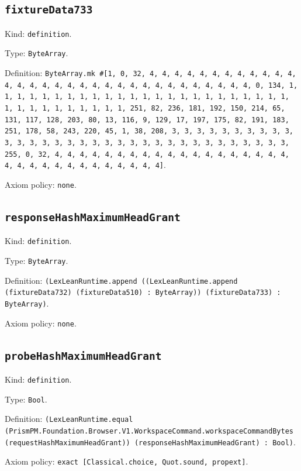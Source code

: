 \documentclass[11pt]{article}
\begin{document}
\subsection*{\texttt{fixtureData733}}
\noindent Kind: \texttt{definition}.\par
\noindent Type: \texttt{ByteArray}.\par
\noindent Definition: \texttt{ByteArray.mk \#[1, 0, 32, 4, 4, 4, 4, 4, 4, 4, 4, 4, 4, 4, 4, 4, 4, 4, 4, 4, 4, 4, 4, 4, 4, 4, 4, 4, 4, 4, 4, 4, 4, 4, 4, 0, 134, 1, 1, 1, 1, 1, 1, 1, 1, 1, 1, 1, 1, 1, 1, 1, 1, 1, 1, 1, 1, 1, 1, 1, 1, 1, 1, 1, 1, 1, 1, 1, 1, 1, 1, 251, 82, 236, 181, 192, 150, 214, 65, 131, 117, 128, 203, 80, 13, 116, 9, 129, 17, 197, 175, 82, 191, 183, 251, 178, 58, 243, 220, 45, 1, 38, 208, 3, 3, 3, 3, 3, 3, 3, 3, 3, 3, 3, 3, 3, 3, 3, 3, 3, 3, 3, 3, 3, 3, 3, 3, 3, 3, 3, 3, 3, 3, 3, 3, 3, 255, 0, 32, 4, 4, 4, 4, 4, 4, 4, 4, 4, 4, 4, 4, 4, 4, 4, 4, 4, 4, 4, 4, 4, 4, 4, 4, 4, 4, 4, 4, 4, 4, 4, 4]}.\par
\noindent Axiom policy: \texttt{none}.\par
\subsection*{\texttt{responseHashMaximumHeadGrant}}
\noindent Kind: \texttt{definition}.\par
\noindent Type: \texttt{ByteArray}.\par
\noindent Definition: \texttt{(LexLeanRuntime.append ((LexLeanRuntime.append (fixtureData732) (fixtureData510) : ByteArray)) (fixtureData733) : ByteArray)}.\par
\noindent Axiom policy: \texttt{none}.\par
\subsection*{\texttt{probeHashMaximumHeadGrant}}
\noindent Kind: \texttt{definition}.\par
\noindent Type: \texttt{Bool}.\par
\noindent Definition: \texttt{(LexLeanRuntime.equal (PrismPM.Foundation.Browser.V1.WorkspaceCommand.workspaceCommandBytes (requestHashMaximumHeadGrant)) (responseHashMaximumHeadGrant) : Bool)}.\par
\noindent Axiom policy: \texttt{exact [Classical.choice, Quot.sound, propext]}.\par
\end{document}
